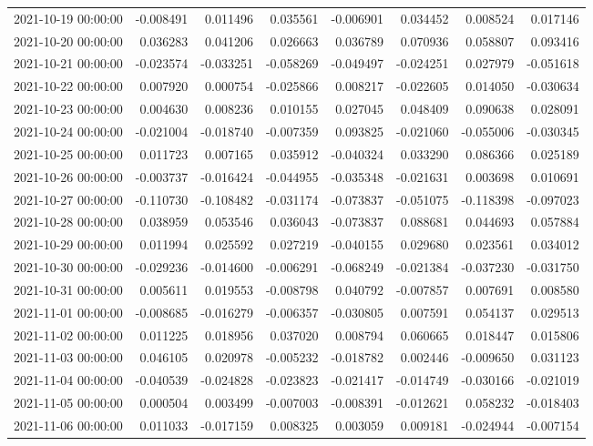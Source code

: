 \begin{tabular}{lrrrrrrr}
2021-10-19 00:00:00 & -0.008491 & 0.011496 & 0.035561 & -0.006901 & 0.034452 & 0.008524 & 0.017146 \\
2021-10-20 00:00:00 & 0.036283 & 0.041206 & 0.026663 & 0.036789 & 0.070936 & 0.058807 & 0.093416 \\
2021-10-21 00:00:00 & -0.023574 & -0.033251 & -0.058269 & -0.049497 & -0.024251 & 0.027979 & -0.051618 \\
2021-10-22 00:00:00 & 0.007920 & 0.000754 & -0.025866 & 0.008217 & -0.022605 & 0.014050 & -0.030634 \\
2021-10-23 00:00:00 & 0.004630 & 0.008236 & 0.010155 & 0.027045 & 0.048409 & 0.090638 & 0.028091 \\
2021-10-24 00:00:00 & -0.021004 & -0.018740 & -0.007359 & 0.093825 & -0.021060 & -0.055006 & -0.030345 \\
2021-10-25 00:00:00 & 0.011723 & 0.007165 & 0.035912 & -0.040324 & 0.033290 & 0.086366 & 0.025189 \\
2021-10-26 00:00:00 & -0.003737 & -0.016424 & -0.044955 & -0.035348 & -0.021631 & 0.003698 & 0.010691 \\
2021-10-27 00:00:00 & -0.110730 & -0.108482 & -0.031174 & -0.073837 & -0.051075 & -0.118398 & -0.097023 \\
2021-10-28 00:00:00 & 0.038959 & 0.053546 & 0.036043 & -0.073837 & 0.088681 & 0.044693 & 0.057884 \\
2021-10-29 00:00:00 & 0.011994 & 0.025592 & 0.027219 & -0.040155 & 0.029680 & 0.023561 & 0.034012 \\
2021-10-30 00:00:00 & -0.029236 & -0.014600 & -0.006291 & -0.068249 & -0.021384 & -0.037230 & -0.031750 \\
2021-10-31 00:00:00 & 0.005611 & 0.019553 & -0.008798 & 0.040792 & -0.007857 & 0.007691 & 0.008580 \\
2021-11-01 00:00:00 & -0.008685 & -0.016279 & -0.006357 & -0.030805 & 0.007591 & 0.054137 & 0.029513 \\
2021-11-02 00:00:00 & 0.011225 & 0.018956 & 0.037020 & 0.008794 & 0.060665 & 0.018447 & 0.015806 \\
2021-11-03 00:00:00 & 0.046105 & 0.020978 & -0.005232 & -0.018782 & 0.002446 & -0.009650 & 0.031123 \\
2021-11-04 00:00:00 & -0.040539 & -0.024828 & -0.023823 & -0.021417 & -0.014749 & -0.030166 & -0.021019 \\
2021-11-05 00:00:00 & 0.000504 & 0.003499 & -0.007003 & -0.008391 & -0.012621 & 0.058232 & -0.018403 \\
2021-11-06 00:00:00 & 0.011033 & -0.017159 & 0.008325 & 0.003059 & 0.009181 & -0.024944 & -0.007154 \\

\end{tabular}
